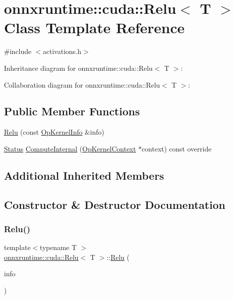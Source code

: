 \hypertarget{classonnxruntime_1_1cuda_1_1Relu}{}\section{onnxruntime\+:\+:cuda\+:\+:Relu$<$ T $>$ Class Template Reference}
\label{classonnxruntime_1_1cuda_1_1Relu}


{\ttfamily \#include $<$activations.\+h$>$}



Inheritance diagram for onnxruntime\+:\+:cuda\+:\+:Relu$<$ T $>$\+:


Collaboration diagram for onnxruntime\+:\+:cuda\+:\+:Relu$<$ T $>$\+:
\subsection*{Public Member Functions}
\begin{DoxyCompactItemize}
\item 
\mbox{\hyperlink{classonnxruntime_1_1cuda_1_1Relu_aa234ddef1046a11c475b2d960febeba0}{Relu}} (const \mbox{\hyperlink{classonnxruntime_1_1OpKernelInfo}{Op\+Kernel\+Info}} \&info)
\item 
\mbox{\hyperlink{classonnxruntime_1_1common_1_1Status}{Status}} \mbox{\hyperlink{classonnxruntime_1_1cuda_1_1Relu_af1f9bdff79823d67d48c40e18d16c0ce}{Compute\+Internal}} (\mbox{\hyperlink{classonnxruntime_1_1OpKernelContext}{Op\+Kernel\+Context}} $\ast$context) const override
\end{DoxyCompactItemize}
\subsection*{Additional Inherited Members}


\subsection{Constructor \& Destructor Documentation}
\mbox{\label{classonnxruntime_1_1cuda_1_1Relu_aa234ddef1046a11c475b2d960febeba0}} 
\subsubsection{\texorpdfstring{Relu()}{Relu()}}
{\footnotesize\ttfamily template$<$typename T $>$ \\
\mbox{\hyperlink{classonnxruntime_1_1cuda_1_1Relu}{onnxruntime\+::cuda\+::\+Relu}}$<$ T $>$\+::\mbox{\hyperlink{classonnxruntime_1_1cuda_1_1Relu}{Relu}} (\begin{DoxyParamCaption}\item[{const \mbox{\hyperlink{classonnxruntime_1_1OpKernelInfo}{Op\+Kernel\+Info}} \&}]{info }\end{DoxyParamCaption})\hspace{0.3cm}{\ttfamily [inline]}}



